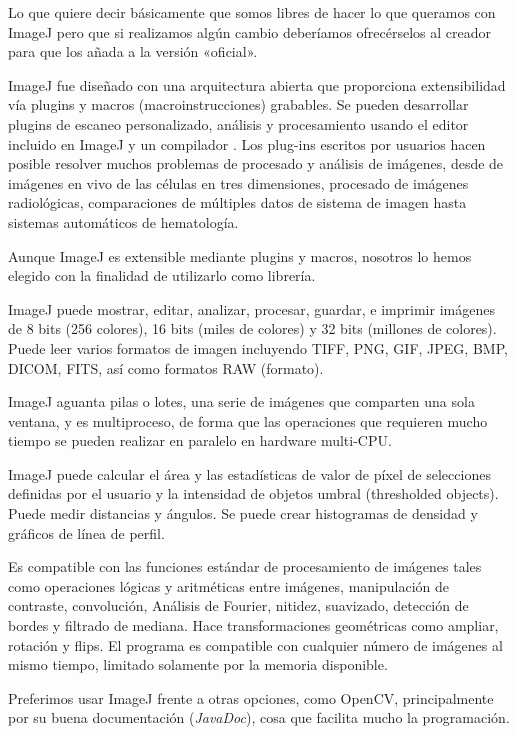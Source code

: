 Lo que quiere decir básicamente que somos libres de hacer lo que queramos con ImageJ pero que si realizamos algún cambio deberíamos ofrecérselos al creador para que los añada a la versión «oficial».

ImageJ fue diseñado con una arquitectura abierta que proporciona extensibilidad vía plugins \java{} y macros (macroinstrucciones) grabables. Se pueden desarrollar plugins de escaneo personalizado, análisis y procesamiento usando el editor incluido en ImageJ y un compilador \java{}. Los plug-ins escritos por usuarios hacen posible resolver muchos problemas de procesado y análisis de imágenes, desde de imágenes en vivo de las células en tres dimensiones, procesado de imágenes radiológicas, comparaciones de múltiples datos de sistema de imagen hasta sistemas automáticos de hematología.

Aunque ImageJ es extensible mediante plugins y macros, nosotros lo hemos elegido con la finalidad de utilizarlo como librería.

ImageJ puede mostrar, editar, analizar, procesar, guardar, e imprimir imágenes de 8 bits (256 colores), 16 bits (miles de colores) y 32 bits (millones de colores). Puede leer varios formatos de imagen incluyendo TIFF, PNG, GIF, JPEG, BMP, DICOM, FITS, así como formatos RAW (formato).

ImageJ aguanta pilas o lotes, una serie de imágenes que comparten una sola ventana, y es multiproceso, de forma que las operaciones que requieren mucho tiempo se pueden realizar en paralelo en hardware multi-CPU.

ImageJ puede calcular el área y las estadísticas de valor de píxel de selecciones definidas por el usuario y la intensidad de objetos umbral (thresholded objects). Puede medir distancias y ángulos. Se puede crear histogramas de densidad y gráficos de línea de perfil.

Es compatible con las funciones estándar de procesamiento de imágenes tales como operaciones lógicas y aritméticas entre imágenes, manipulación de contraste, convolución, Análisis de Fourier, nitidez, suavizado, detección de bordes y filtrado de mediana. Hace transformaciones geométricas como ampliar, rotación y flips. El programa es compatible con cualquier número de imágenes al mismo tiempo, limitado solamente por la memoria disponible.

Preferimos usar ImageJ frente a otras opciones, como OpenCV, principalmente por su buena documentación (\textit{JavaDoc}), cosa que facilita mucho la programación.


